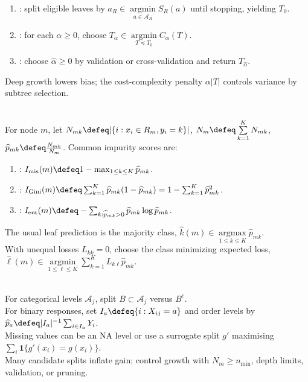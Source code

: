 \begin{method} \label{meth:sl-cart-tree-growing-and-pruning} 
\begin{enumerate}[label=(\roman*)]
\setlength{\itemsep}{0pt}
\item {}: split eligible leaves by $a_R\in\operatorname*{argmin}\limits_{a\in\mathcal{A}_R}S_R(a)$ until stopping, yielding $T_0$.
\item {}: for each $\alpha\geq0$, choose $T_\alpha\in\operatorname*{argmin}\limits_{T\preceq T_0}C_\alpha(T)$.
\item {}: choose $\widehat{\alpha}\geq0$ by validation or cross-validation and return $T_{\widehat{\alpha}}$.
\end{enumerate}
Deep growth lowers bias; the cost-complexity penalty $\alpha|T|$ controls variance by subtree selection.
\end{method}

\begin{definition} \label{def:sl-classification-tree-impurity} \\
For node $m$, let $N_{mk}\defeq|\{i:x_i\in R_m,y_i=k\}|$, $N_m\defeq\sum\limits_{k=1}^K N_{mk}$, $\widehat{p}_{mk}\defeq \frac{N_{mk}}{N_m}$. Common impurity scores are:
\begin{enumerate}[label=(\roman*)]
\setlength{\itemsep}{0pt}
\item {}: $I_{\mathrm{mis}}(m)\defeq1-\max_{1\leq k\leq K}\widehat{p}_{mk}$.
\item {}: $I_{\mathrm{Gini}}(m)\defeq\sum_{k=1}^K\widehat{p}_{mk}(1-\widehat{p}_{mk})=1-\sum_{k=1}^K\widehat{p}_{mk}^2$.
\item {}: $I_{\mathrm{ent}}(m)\defeq-\sum_{k:\widehat{p}_{mk}>0}\widehat{p}_{mk}\log\widehat{p}_{mk}$.
\end{enumerate}
The usual leaf prediction is the majority class, $\widehat{k}(m)\in\operatorname*{argmax}\limits_{1\leq k\leq K}\widehat{p}_{mk}$. \\
With unequal losses $L_{kk}=0$, choose the class minimizing expected loss, $\widehat{\ell}(m)\in\operatorname*{argmin}\limits_{1\leq\ell\leq K}\sum_{k=1}^K L_{k\ell}\widehat{p}_{mk}$.
\end{definition}

\begin{remark} \label{rem:sl-tree-practical-issues} \\
For categorical levels $\mathcal{A}_j$, split $B\subset\mathcal{A}_j$ versus $B^c$.\\
For binary responses, set $I_a\defeq\{i:X_{ij}=a\}$ and order levels by $\widehat{p}_a\defeq |I_a|^{-1}\sum_{i\in I_a}Y_i$.\\
Missing values can be an $\mathrm{NA}$ level or use a surrogate split $g'$ maximising $\sum_i\mathbf{1}\{g'(x_i)=g(x_i)\}$.\\
Many candidate splits inflate gain; control growth with $N_m\geq n_{\min}$, depth limits, validation, or pruning.
\end{remark}

